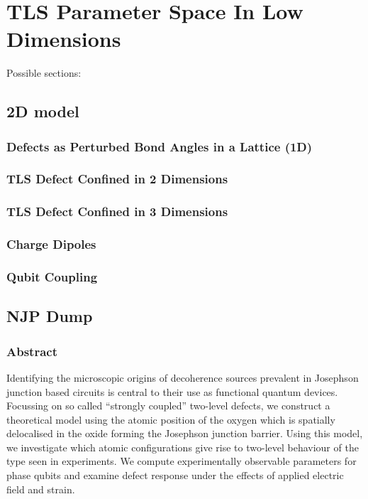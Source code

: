 \versoimage
\chapter[TLSs In Low Dimensions]{TLS Parameter Space In Low Dimensions}\label{ch:lowdims}

Possible sections:

\section{2D model}\label{sec:2d}
\subsection{Defects as Perturbed Bond Angles in a Lattice (1D)}
\subsection{TLS Defect Confined in 2 Dimensions}
\subsection{TLS Defect Confined in 3 Dimensions}
\subsection{Charge Dipoles}
\subsection{Qubit Coupling}

\section{NJP Dump}
\subsection{Abstract}
Identifying the microscopic origins of decoherence sources prevalent in Josephson junction based circuits is central to their use as functional quantum devices.
Focussing on so called ``strongly coupled'' two-level defects, we construct a theoretical model using the atomic position of the oxygen which is spatially delocalised in the oxide forming the Josephson junction barrier.
Using this model, we investigate which atomic configurations give rise to two-level behaviour of the type seen in experiments.
We compute experimentally observable parameters for phase qubits and examine defect response under the effects of applied electric field and strain.


